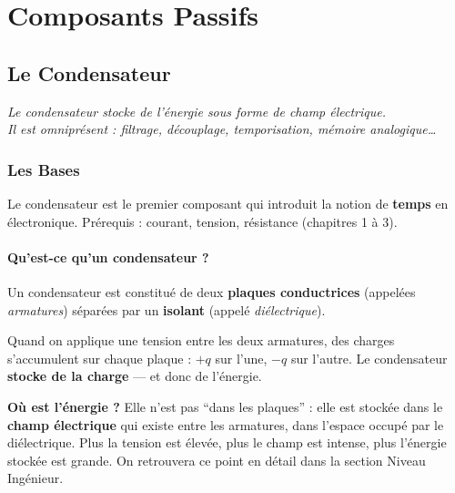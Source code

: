 \documentclass[12pt,a4paper,twoside]{book}
\begin{document}
\part{Composants Passifs}

\chapter{Le Condensateur}

\begin{center}
\textit{Le condensateur stocke de l'énergie sous forme de champ électrique.\\
Il est omniprésent : filtrage, découplage, temporisation, mémoire analogique\ldots}
\end{center}

\vspace{0.5cm}

\section{Les Bases}

\begin{bases}
Le condensateur est le premier composant qui introduit la notion de \textbf{temps} en électronique. Prérequis : courant, tension, résistance (chapitres 1 à 3).
\end{bases}

\subsection{Qu'est-ce qu'un condensateur ?}

Un condensateur est constitué de deux \textbf{plaques conductrices} (appelées \textit{armatures}) séparées par un \textbf{isolant} (appelé \textit{diélectrique}).

Quand on applique une tension entre les deux armatures, des charges s'accumulent sur chaque plaque : $+q$ sur l'une, $-q$ sur l'autre. Le condensateur \textbf{stocke de la charge} --- et donc de l'énergie.

\begin{intuition}
\textbf{Où est l'énergie ?} Elle n'est pas ``dans les plaques'' : elle est stockée dans le \textbf{champ électrique} qui existe entre les armatures, dans l'espace occupé par le diélectrique. Plus la tension est élevée, plus le champ est intense, plus l'énergie stockée est grande. On retrouvera ce point en détail dans la section Niveau Ingénieur.
\end{intuition}
\end{document}
